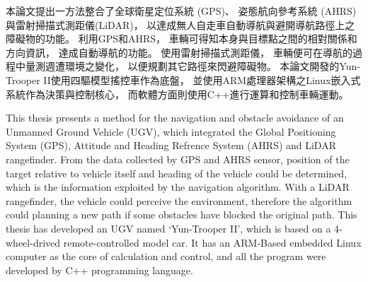 \begin{abstractzh}
本論文提出一方法整合了全球衛星定位系統 (GPS)、
姿態航向參考系統 (AHRS)
與雷射掃描式測距儀(LiDAR)，
以達成無人自走車自動導航與避開導航路徑上之障礙物的功能。
利用GPS和AHRS，
車輛可得知本身與目標點之間的相對關係和方向資訊，
達成自動導航的功能。
使用雷射掃描式測距儀，
車輛便可在導航的過程中量測週遭環境之變化，
以便規劃其它路徑來閃避障礙物。
本論文開發的Yun-Trooper II使用四驅模型搖控車作為底盤，
並使用ARM處理器架構之Linux嵌入式系統作為決策與控制核心，
而軟體方面則使用C++進行運算和控制車輛運動。


\end{abstractzh}

\begin{abstracten}
This thesis presents a method for the navigation and obstacle avoidance 
of an Unmanned Ground Vehicle (UGV), which integrated the
Global Positioning System (GPS), 
Attitude and Heading Refrence System (AHRS) and
LiDAR rangefinder.
From the data collected by GPS and AHRS sensor, position of the target relative
to vehicle itself and heading of the vehicle could be determined,
which is the information exploited by the navigation algorithm.
With a LiDAR rangefinder, the vehicle could perceive the environment, therefore
the algorithm could planning a new path if some obstacles have blocked the original path.
This thesis has developed an UGV named `Yun-Trooper II', which is based on a 4-wheel-drived
remote-controlled model car. It has an ARM-Based embedded Linux computer as
the core of calculation and control, and all the program were developed by C++ programming
language.


\end{abstracten}